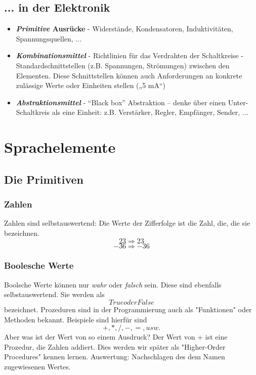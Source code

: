 \subsection{... in der Elektronik}
\begin{itemize}
	\item \textbf{\textit{Primitive} Ausrücke}
		\subitem - Widerstände, Kondensatoren, Induktivitäten, Spannungsquellen, ...

	\item \textbf{\textit{Kombinationsmittel}}
		\subitem - Richtlinien für das Verdrahten der Schaltkreise
		\subitem - Standardschnittstellen (z.B. Spannungen, Strömungen) zwischen den
		Elementen. Diese Schnittstellen können auch Anforderungen an
		konkrete zulässige Werte oder Einheiten stellen („5 mA“)

	\item \textbf{\textit{Abstraktionsmittel}}
		\subitem - 	“Black box” Abstraktion – denke über einen Unter-Schaltkreis als eine
		Einheit: z.B. Verstärker, Regler, Empfänger, Sender, ...
\end{itemize}


\section{Sprachelemente}

\subsection{Die Primitiven}
\subsubsection{Zahlen}
Zahlen sind selbstauswertend: Die Werte der Zifferfolge ist die Zahl,
die, die sie bezeichnen.
$$ 23 \Rightarrow 23 $$
$$ -36 \Rightarrow -36 $$

\subsubsection{Boolesche Werte}
Boolsche Werte können nur \textit{wahr} oder \textit{falsch} sein. Diese sind ebenfalls
selbstauswertend. Sie werden als $$True  oder  False$$ bezeichnet.
Prozeduren sind in der Programmierung auch als "Funktionen" oder Methoden bekannt. Beispiele sind hierfür sind
$$ +, *, /, -, =, usw.$$
Aber was ist der Wert von so einem Ausdruck? Der Wert von + ist eine Prozedur, die Zahlen addiert. Dies werden wir später als "Higher-Order Procedures" kennen lernen.
Auswertung: Nachschlagen des dem Namen zugewiesenen Wertes.

